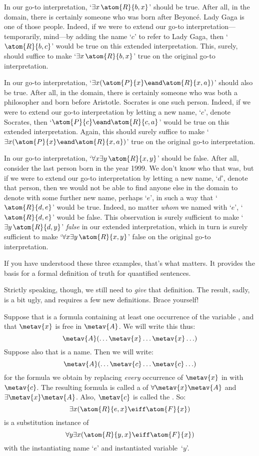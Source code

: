 In our go-to interpretation, `$\exists x\, \atom{R}{b,x}$' should be true. After all, in the domain, there is certainly someone who was born after Beyonc\'e. Lady Gaga is one of those people. Indeed, if we were to extend our go-to interpretation---temporarily, mind---by adding the name `$c$' to refer to Lady Gaga, then `$\atom{R}{b,c}$' would be true on this extended interpretation. This, surely, should suffice to make `$\exists x\, \atom{R}{b,x}$' true on the original go-to interpretation.

In our go-to interpretation, `$\exists x (\atom{P}{x} \eand \atom{R}{x,a})$' should also be true. After all, in the domain, there is certainly someone who was both a philosopher and born before Aristotle. Socrates is one such person. Indeed, if we were to extend our go-to interpretation by letting a new name, `$c$', denote Socrates, then `$\atom{P}{c} \eand \atom{R}{c,a}$' would be true on this extended interpretation. Again, this should surely suffice to make `$\exists x (\atom{P}{x} \eand \atom{R}{x,a})$' true on the original go-to interpretation.

In our go-to interpretation, `$\forall x \exists y\, \atom{R}{x,y}$' should be false. After all, consider the last person born in the year 1999. We don't know who that was, but if we were to extend our go-to interpretation by letting a new name, `$d$', denote that person, then we would not be able to find anyone else in the domain to denote with some further new name, perhaps `$e$', in such a way that `$\atom{R}{d,e}$' would be true. Indeed, no matter \emph{whom} we named with `$e$', `$\atom{R}{d,e}$' would be false. This observation is surely sufficient to make `$\exists y\, \atom{R}{d,y}$' \emph{false} in our extended interpretation, which in turn is surely sufficient to make `$\forall x \exists y\, \atom{R}{x,y}$' false on the original go-to interpretation.

If you have understood these three examples, that's what matters. It provides the basis for a formal definition of truth for quantified sentences.

Strictly speaking, though, we still need to \emph{give} that definition. The result, sadly, is a bit ugly, and requires a few new definitions. Brace yourself!

Suppose that  is a formula containing at least one occurrence of the variable , and that $\metav{x}$ is free in $\metav{A}$. We will write this thus:
$$\metav{A}(\ldots \metav{x} \ldots \metav{x} \ldots)$$
Suppose also that  is a name. Then we will write:
$$\metav{A}(\ldots \metav{c} \ldots \metav{c} \ldots)$$
for the formula we obtain by replacing \emph{every} occurrence of $\metav{x}$ in  with~$\metav{c}$. The resulting formula is called a  of $\forall \metav{x}\metav{A}$ and $\exists\metav{x}\metav{A}$.  Also, $\metav{c}$ is called the . So:
	$$\exists x (\atom{R}{e,x} \eiff \atom{F}{x})$$
is a substitution instance of 
	$$\forall y \exists x (\atom{R}{y,x} \eiff \atom{F}{x})$$
with the instantiating name `$e$' and instantiated variable~`$y$'.


